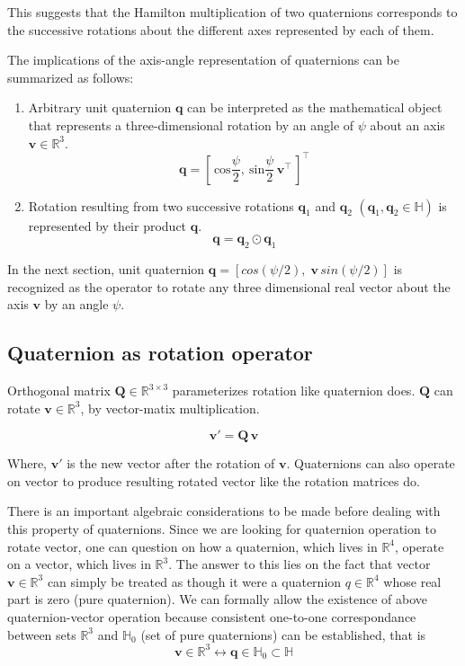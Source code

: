 \documentclass[12pt]{article}
\begin{document}
This suggests that the Hamilton multiplication of two quaternions corresponds to the successive rotations about the different axes represented by each of them.

The implications of the axis-angle representation of quaternions can be summarized as follows:

\begin{enumerate}
    \item Arbitrary unit quaternion $\bm{q}$ can be interpreted as the mathematical object that represents a three-dimensional rotation by an angle of $\psi$ about an axis $\bm{v} \in \mathbb{R}^{3}$.
    $$\bm{q} = \left[\, \text{cos}\frac{\psi}{2} ,\: \text{sin}\frac{\psi}{2} \, \bm{v}^{\intercal}  \, \right]^{\intercal}$$
    \item Rotation resulting from two successive rotations $\bm{q}_{1}$ and $\bm{q}_{2}$ $(\bm{q}_{1}, \bm{q}_{2} \in \mathbb{H})$ is represented by their product $\bm{q}$.
    $$\bm{q} = \bm{q}_{2} \odot \bm{q}_{1}$$ 
\end{enumerate}

In the next section, unit quaternion $\bm{q} = [cos(\psi/2), \; \bm{v} \, sin(\psi/2)]$ is recognized as the operator to rotate any three dimensional real vector about the axis $\bm{v}$ by an angle $\psi$.  

\subsection{Quaternion as rotation operator}
Orthogonal matrix $\bm{Q} \in \mathbb{R}^{3\times3}$ parameterizes rotation like quaternion does. $\bm{Q}$ can rotate $\bm{v} \in \mathbb{R}^{3}$, by vector-matix multiplication.

\begin{equation}
    \bm{v}' = \bm{Q} \, \bm{v}
\end{equation}

Where, $\bm{v}'$ is the new vector after the rotation of $\bm{v}$. Quaternions can also operate on vector to produce resulting rotated vector like the rotation matrices do. 

There is an important algebraic considerations to be made before dealing with this property of quaternions. Since we are looking for quaternion operation to rotate vector, one can question on how a quaternion, which lives in $\mathbb{R}^{4}$, operate on a vector, which lives in $\mathbb{R}^{3}$. The answer to this lies on the fact that vector $\bm{v} \in \mathbb{R}^{3}$ can simply be treated as though it were a quaternion $q \in \mathbb{R}^{4}$ whose real part is zero (pure quaternion). We can formally allow the existence of above quaternion-vector operation because consistent one-to-one correspondance between sets $\mathbb{R}^{3}$ and $\mathbb{H}_{0}$ (set of pure quaternions) can be established, that is
\begin{equation}
\bm{v} \in \mathbb{R}^{3} \leftrightarrow \bm{q} \in \mathbb{H}_{0} \subset \mathbb{H}
\end{equation}
 
\end{document}
